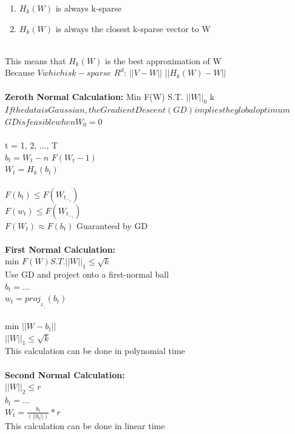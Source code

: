 \documentclass[12pt]{article}
\begin{document}
    \begin{enumerate}
        \item {$H_k(W)$ is always k-sparse}
        \item{$H_k(W)$ is always the closest k-sparse vector to W}
    \end{enumerate}
    \\
    This means that $H_k(W)$ is the best approximation of W \\
    Because \forall $V which is k-sparse $ \in $R^d$: $||V - W||$ \geq ||$H_k(W) - W||$\\
    \\
    \textbf{Zeroth Normal Calculation:}
    Min F(W) S.T. $||W||_0$ \leq k\\
    $If the data is Gaussian, the Gradient Descent (GD) implies the global optimum$\\
    $GD is feasible when W_0 = 0$\\
    \\
    t = 1, 2, ..., T\\
    $b_t = W_t - n$ \nabla $F(W_t-1)$\\
    $W_t = H_k(b_t)$\\
    \\
    $F(b_t) \leq F(W_t_-_1)$\\
    $F(w_t) \leq F(W_t_-_1)$\\
    $F(W_t) \approx F(b_t)$ Guaranteed by GD\\
    \\
    \textbf{First Normal Calculation:}\\
    min $F(W) S.T. ||W||_1 \leq \sqrt{k}$\\
    Use GD and project onto a first-normal ball\\
    $b_t = ...$\\
    $w_t = proj__L__1(b_t)$\\
    \\
    min $||W-b_t||$\\
    $||W||_1 \leq \sqrt{k}$\\
    This calculation can be done in polynomial time\\
    \\
    \textbf{Second Normal Calculation:}\\
    $||W||_2 \leq r$\\
    $b_t = ...$\\
    $W_t = \frac{b_t}{(||b_t||)} * r$\\
    This calculation can be done in linear time\\
\end{document}
